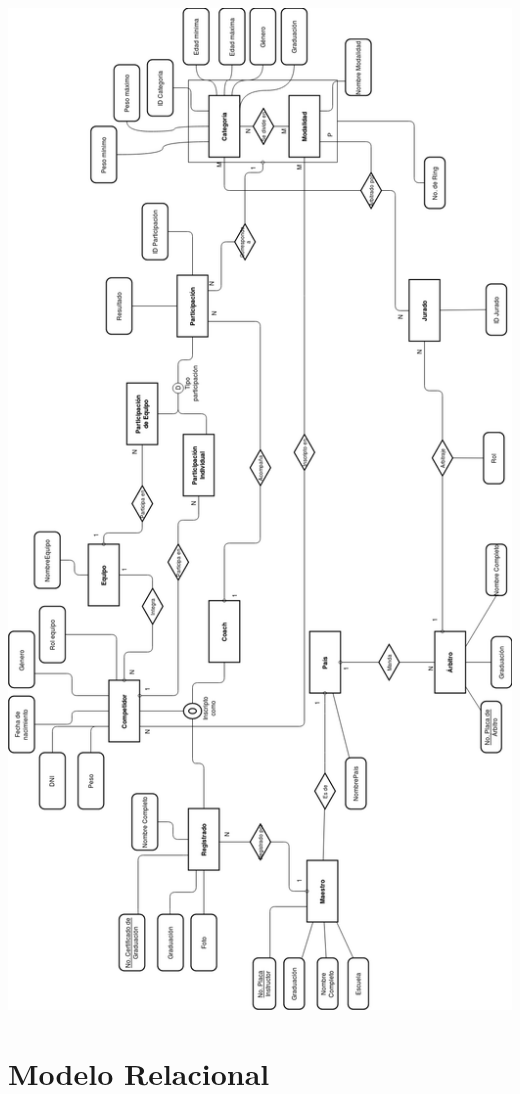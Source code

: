 \documentclass[a4paper]{article}
\begin{document}
\includegraphics[height = \textheight]{mundialtaekwondo.png}

\section{Modelo Relacional}
\end{document}
